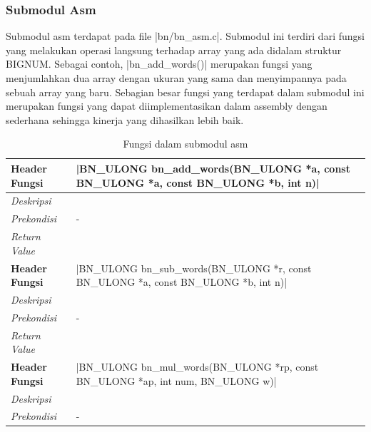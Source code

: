     \subsubsection{Submodul Asm} \label{sec:bn_asm}
      Submodul asm terdapat pada file |bn/bn_asm.c|. Submodul ini terdiri dari fungsi yang melakukan operasi langsung terhadap array yang ada didalam struktur BIGNUM. Sebagai contoh, |bn_add_words()| merupakan fungsi yang menjumlahkan dua array dengan ukuran yang sama dan menyimpannya pada sebuah array yang baru. Sebagian besar fungsi yang terdapat dalam submodul ini merupakan fungsi yang dapat diimplementasikan dalam assembly dengan sederhana sehingga kinerja yang dihasilkan lebih baik.

      \begin{table}[h]
        \caption{Fungsi dalam submodul asm}
        \begin{tabular}{R{2.8cm}L{10.5cm}}
          \toprule
          \textbf{Header Fungsi} & |BN_ULONG bn_add_words(BN_ULONG *a, const BN_ULONG *a, const BN_ULONG *b, int n)|  \\ \midrule
          \textit{Deskripsi}     &                                                                                    \\
          \textit{Prekondisi}    & -                                                                                  \\
          \textit{Return Value}  &
          \\ \bottomrule
          \textbf{Header Fungsi} & |BN_ULONG bn_sub_words(BN_ULONG *r, const BN_ULONG *a, const BN_ULONG *b, int n)|  \\ \midrule
          \textit{Deskripsi}     &                                                                                    \\
          \textit{Prekondisi}    & -                                                                                  \\
          \textit{Return Value}  &
          \\ \bottomrule
          \textbf{Header Fungsi} & |BN_ULONG bn_mul_words(BN_ULONG *rp, const BN_ULONG *ap, int num, BN_ULONG w)|     \\ \midrule
          \textit{Deskripsi}     &                                                                                    \\
          \textit{Prekondisi}    & -                                                                                  \\

\end{tabular}
\end{table}
